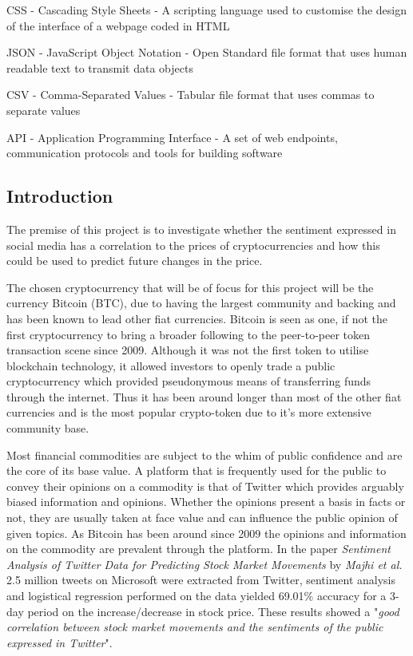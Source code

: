 \documentclass[oneside, 12pt]{article}
\begin{document}
	CSS - Cascading Style Sheets - A scripting language used to customise the design of the interface of a webpage coded in HTML
	
	JSON - JavaScript Object Notation - Open Standard file format that uses human readable text to transmit data objects
	
	CSV - Comma-Separated Values - Tabular file format that uses commas to separate values
	
	API - Application Programming Interface - A set of web endpoints, communication protocols and tools for building software
	
	\newpage
	
	\begin{center}
		\tableofcontents
	\end{center}
	
	\newpage
	\begin{center}
		\section{Introduction}\label{introduction}
	\end{center}
	The premise of this project is to investigate whether the sentiment expressed in social media has a correlation to the prices of cryptocurrencies and how this could be used to predict future changes in the price. 
	
	The chosen cryptocurrency that will be of focus for this project will be the currency Bitcoin (BTC), due to having the largest community and backing and has been known to lead other fiat currencies. Bitcoin is seen as one, if not the first cryptocurrency to bring a broader following to the peer-to-peer token transaction scene since 2009. Although it was not the first token to utilise blockchain technology, it allowed investors to openly trade a public cryptocurrency which provided pseudonymous means of transferring funds through the internet. Thus it has been around longer than most of the other fiat currencies and is the most popular crypto-token due to it's more extensive community base.
	
	Most financial commodities are subject to the whim of public confidence and are the core of its base value. A platform that is frequently used for the public to convey their opinions on a commodity is that of Twitter which provides arguably biased information and opinions. Whether the opinions present a basis in facts or not, they are usually taken at face value and can influence the public opinion of given topics. As Bitcoin has been around since 2009 the opinions and information on the commodity are prevalent through the platform. 
	In the paper \textit{Sentiment Analysis of Twitter Data for Predicting Stock Market Movements} by \textit{Majhi et al.} \cite{SaTdpsmm} 2.5 million tweets on Microsoft were extracted from Twitter, sentiment analysis and logistical regression performed on the data yielded 69.01\% accuracy for a 3-day period on the increase/decrease in stock price. These results showed a "\textit{good correlation between stock market movements and the sentiments of the public expressed in Twitter}".
	
\end{document}
